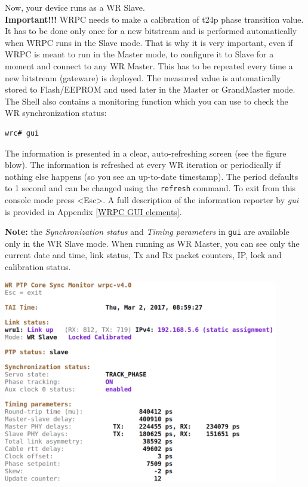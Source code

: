 \documentclass[a4paper, 12pt]{article}
\renewcommand{\_}{\underscore\allowbreak}
\begin{document}
Now, your device runs as a WR Slave.\\

\textbf{Important!!!} WRPC needs to make a calibration of t24p phase transition
value. It has to be done only once for a new bitstream and is performed
automatically when WRPC runs in the Slave mode. That is why it is very
important, even if WRPC is meant to run in the Master mode, to configure it to
Slave for a moment and connect to any WR Master. This has to be repeated every
time a new bitstream (gateware) is deployed. The measured value is automatically
stored to Flash/EEPROM and used later in the Master or GrandMaster mode.\\

The Shell also contains a monitoring function which you can use to check the
WR synchronization status:

\begin{lstlisting}
wrc# gui
\end{lstlisting}

The information is presented in a clear, auto-refreshing screen (see the figure blow). 
The information is refreshed at every WR iteration or periodically if
nothing else happens (so you see an up-to-date timestamp). The period
defaults to 1 second and can be changed using the \texttt{refresh} command. To
exit from this console mode press <Esc>. A full description of the information
reporter by \textit{gui} is provided in Appendix \ref{WRPC GUI elements}.

\noindent\textbf{Note:} the \textit{Synchronization status} and \textit{Timing
parameters} in \texttt{gui} are available only in the WR Slave mode. When
running as WR Master, you can see only the current date and time,
link status, Tx and Rx packet counters, IP, lock and calibration status.

\vspace{1em}
\includegraphics[width=12cm]{wrpc_mon.png}
\vspace{1em}
\end{document}
